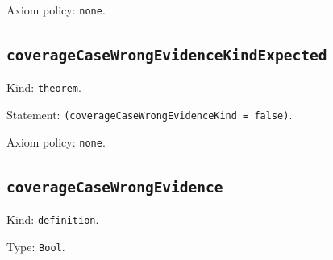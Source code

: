\documentclass[11pt]{article}
\begin{document}
\noindent Axiom policy: \texttt{none}.\par
\subsection*{\texttt{coverageCaseWrongEvidenceKindExpected}}
\noindent Kind: \texttt{theorem}.\par
\noindent Statement: \texttt{(coverageCaseWrongEvidenceKind = false)}.\par
\noindent Axiom policy: \texttt{none}.\par
\subsection*{\texttt{coverageCaseWrongEvidence}}
\noindent Kind: \texttt{definition}.\par
\noindent Type: \texttt{Bool}.\par
\end{document}
